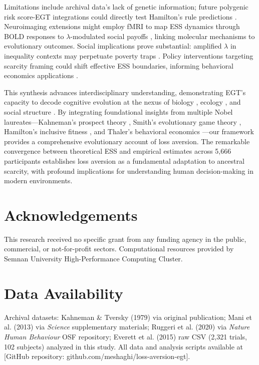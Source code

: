 \documentclass[11pt,twocolumn]{article}
\begin{document}
Limitations include archival data's lack of genetic information; future polygenic risk score-EGT integrations could directly test Hamilton's rule predictions \citep{cesar2018}. Neuroimaging extensions might employ fMRI to map ESS dynamics through BOLD responses to $\lambda$-modulated social payoffs \citep{greengard2000}, linking molecular mechanisms to evolutionary outcomes. Social implications prove substantial: amplified $\lambda$ in inequality contexts may perpetuate poverty traps \citep{mani2013,krugman1991}. Policy interventions targeting scarcity framing could shift effective ESS boundaries, informing behavioral economics applications \citep{thaler2015}.

This synthesis advances interdisciplinary understanding, demonstrating EGT's capacity to decode cognitive evolution at the nexus of biology \citep{sperry1981}, ecology \citep{arrow1963}, and social structure \citep{schelling1960}. By integrating foundational insights from multiple Nobel laureates—Kahneman's prospect theory \citep{kahneman1979}, Smith's evolutionary game theory \citep{smith1982}, Hamilton's inclusive fitness \citep{hamilton1964}, and Thaler's behavioral economics \citep{thaler2015}—our framework provides a comprehensive evolutionary account of loss aversion. The remarkable convergence between theoretical ESS and empirical estimates across 5,666 participants establishes loss aversion as a fundamental adaptation to ancestral scarcity, with profound implications for understanding human decision-making in modern environments.

\section*{Acknowledgements}
This research received no specific grant from any funding agency in the public, commercial, or not-for-profit sectors. Computational resources provided by Semnan University High-Performance Computing Cluster.

\section*{Data Availability}
Archival datasets: Kahneman \& Tversky (1979) via original publication; Mani et al. (2013) via \textit{Science} supplementary materials; Ruggeri et al. (2020) via \textit{Nature Human Behaviour} OSF repository; Everett et al. (2015) raw CSV (2,321 trials, 102 subjects) analyzed in this study. All data and analysis scripts available at [GitHub repository: github.com/meshaghi/loss-aversion-egt].
\end{document}
